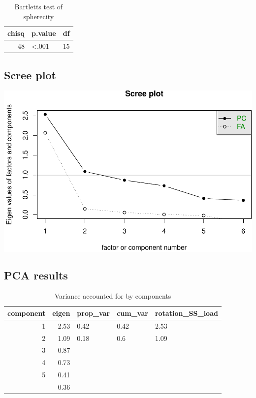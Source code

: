 \documentclass[]{article}
\begin{document}
\begin{table}[H]

\caption{\label{tab:unnamed-chunk-4}Bartletts test of spherecity}
\centering
\fontsize{6}{8}\selectfont
\begin{tabular}[t]{rlr}
\toprule
chisq & p.value & df\\
\midrule
48 & <.001 & 15\\
\bottomrule
\end{tabular}
\end{table}

\hypertarget{scree-plot}{%
\subsection{Scree plot}\label{scree-plot}}

\includegraphics{strategy_comms_files/figure-latex/unnamed-chunk-5-1.pdf}

\hypertarget{pca-results}{%
\subsection{PCA results}\label{pca-results}}

\begin{table}[H]

\caption{\label{tab:unnamed-chunk-6}Variance accounted for by components}
\centering
\fontsize{6}{8}\selectfont
\begin{tabular}[t]{rrlll}
\toprule
component & eigen & prop\_var & cum\_var & rotation\_SS\_load\\
\midrule
1 & 2.53 & 0.42 & 0.42 & 2.53\\
2 & 1.09 & 0.18 & 0.6 & 1.09\\
3 & 0.87 &  &  & \\
4 & 0.73 &  &  & \\
5 & 0.41 &  &  & \\
\addlinespace
6 & 0.36 &  &  & \\
\bottomrule
\end{tabular}
\end{table}
\end{document}
